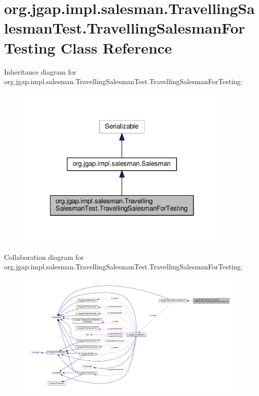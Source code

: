 \hypertarget{classorg_1_1jgap_1_1impl_1_1salesman_1_1_travelling_salesman_test_1_1_travelling_salesman_for_testing}{\section{org.\-jgap.\-impl.\-salesman.\-Travelling\-Salesman\-Test.\-Travelling\-Salesman\-For\-Testing Class Reference}
\label{classorg_1_1jgap_1_1impl_1_1salesman_1_1_travelling_salesman_test_1_1_travelling_salesman_for_testing}
}


Inheritance diagram for org.\-jgap.\-impl.\-salesman.\-Travelling\-Salesman\-Test.\-Travelling\-Salesman\-For\-Testing\-:
\nopagebreak
\begin{figure}[H]
\begin{center}
\leavevmode
\includegraphics[width=294pt]{classorg_1_1jgap_1_1impl_1_1salesman_1_1_travelling_salesman_test_1_1_travelling_salesman_for_testing__inherit__graph}
\end{center}
\end{figure}


Collaboration diagram for org.\-jgap.\-impl.\-salesman.\-Travelling\-Salesman\-Test.\-Travelling\-Salesman\-For\-Testing\-:
\nopagebreak
\begin{figure}[H]
\begin{center}
\leavevmode
\includegraphics[width=350pt]{classorg_1_1jgap_1_1impl_1_1salesman_1_1_travelling_salesman_test_1_1_travelling_salesman_for_testing__coll__graph}
\end{center}
\end{figure}
